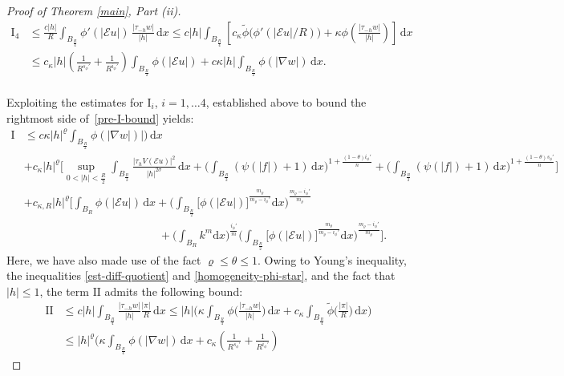 \documentclass[leqno,11pt]{amsart}%
\numberwithin{equation}{section}
\def\d{\mathrm{d}}
\def\E{\mathcal{E}}
\def\dx{\d x}
\theoremstyle{definition}
\numberwithin{equation}{section}
\begin{document}
\begin{proof}[Proof of Theorem \ref{main}, Part (ii)]
\begin{align}
    \mathrm{I_4}&\le 
\frac{c|h|}{R}\int_{B_{\frac R4}}
  \phi'(|\E u|)\,\frac{|\tau_{-h} w|}{|h|} \,\dx
\le
c|h|\int_{B_{\frac R4}}
\left[c_\kappa\widetilde\phi\big(\phi'(|\E u|/R)\big) + \kappa\phi\left(\frac{|\tau_{-h} w|}{|h|}\right)\right]\,\dx
\\ \nonumber
&\le
c_\kappa |h|{\left(\frac{1}{R^{s_\phi'}}+\frac{1}{R^{i_\phi'}}\right)}\int_{B_{\frac R2}}
 \phi(|\E u|) 
+   c\kappa|h|\int_{B_{\frac R2}}\phi\left(|{\nabla} w|\right) 
\,\dx.
\end{align}
 \\Exploiting the 
 estimates for $\mathrm{I}_i$, $i=1, \dots 4$, established above  to bound the rightmost side of~\eqref{pre-I-bound} yields:
\begin{align}\label{aug20}
  \mathrm{I}
 &\le c\kappa|h|^\varrho\int_{B_{\frac R2}}\phi(|\nabla w|)|)\,\dx
 \\ \nonumber &+
  c_\kappa|h|^\varrho\Bigg[\sup_{0<|h|<\frac R2}
\int_{B_{\frac R2}}\frac{|\tau_hV(\E u)|^2}{|h|^{2\sigma}}\, \d x +\bigg(\int_{B_{\frac R2}}(\psi(|f|)+1)\,\dx\bigg)^{1+\frac{({1-\theta}) i_\phi'}{n}}
  +
\bigg(\int_{B_{\frac R2}}(\psi(|f|)+1)\,\dx\bigg)^{1+\frac{({1-\theta}) s_\phi'}{n}}\Bigg]
\\ \nonumber
& +  c_{\kappa,R}|h|^\varrho\Bigg[
 \int_{B_{R}}\phi(|\E u|)\,\dx +
\bigg(\int_{B_{\frac R2}}\big[\phi(|\E u|)\big]^{\frac{{m_\varrho}}{{m_\varrho}-i_\phi'}}\dx\bigg)^{\frac{{m_\varrho}-i_\phi'}{{m_\varrho}}}
\\ \nonumber & \qquad \qquad \qquad \qquad \qquad \qquad +  \bigg(\int_{B_{R}}{k}^{{m}}\dx\bigg)^{\frac{i_\phi'}{  {m}}}\bigg(\int_{B_{\frac R2}}\big[\phi(|\E u|)\big]^{\frac{  {m_\varrho}}{  {m_\varrho}-i_\phi'}}\dx\bigg)^{\frac{  {m_\varrho}-i_\phi'}{  {m_\varrho}}}\Bigg].
\end{align}
 Here, we have also made use of the fact $\varrho\le \theta\le 1$.
Owing to Young's inequality,  the  inequalities \eqref{est-diff-quotient}   and \eqref{homogeneity-phi-star}, and  the fact that $|h|\leq 1$, the term $\mathrm{II}$ admits the following bound:
\begin{align}\label{aug21}
  \mathrm{II}
  &\le
  c|h|\int_{B_{\frac R4}}\frac{|\tau_{-h}w|}{|h|}\frac{|\pi|}{R}\,\dx \le
  |h|\bigg(
\kappa\int_{B_{\frac R4}}\phi\bigg(\frac{|\tau_{-h}w|}{|h|}\bigg)\,\dx
    +
    c_\kappa\int_{B_{\frac R4}}\widetilde \phi\bigg(\frac{|\pi|}{R}\bigg)\,\dx
    \bigg)\\
 \nonumber  &\le
    |h|^{\varrho} \bigg(
    \kappa\int_{B_{\frac R4}}\phi(|\nabla w|)\,\dx
    +
    {c_\kappa\left(\frac{1}{R^{s_\phi'}}+\frac{1}{R^{i_\phi'}}\right)}

\end{align}
\end{proof}
\end{document}
